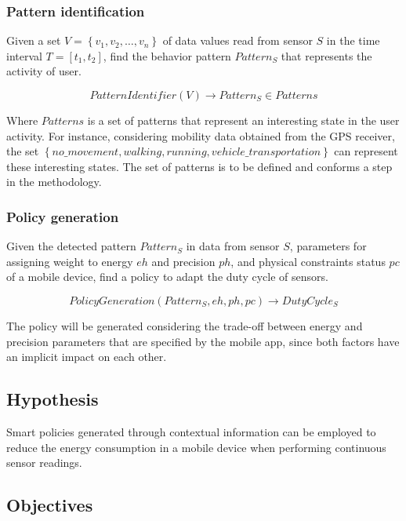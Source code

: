\subsubsection{Pattern identification}
\label{ssub:pattern_identification}
Given a set $V = \left\{v_{1}, v_{2}, \dotsc, v_{n}\right\}$ of data values read from sensor $S$ in the time interval $T = [t_{1}, t_{2}]$, find the behavior pattern $Pattern_{S}$ that represents the activity of user.

\begin{equation}
  PatternIdentifier( V ) \longrightarrow{} Pattern_{S} \in Patterns
\end{equation}

Where $Patterns$ is a set of patterns that represent an interesting state in the user activity.
For instance, considering mobility data obtained from the GPS receiver, the set $\left\{no\_movement, walking, running, vehicle\_transportation\right\}$ can represent these interesting states.
The set of patterns is to be defined and conforms a step in the methodology.


\subsubsection{Policy generation}
\label{ssub:policy_generation}

Given the detected pattern $Pattern_{S}$ in data from sensor $S$, parameters for assigning weight to energy $eh$ and precision $ph$, and physical constraints status $pc$ of a mobile device, find a policy to adapt the duty cycle of sensors.

\begin{equation}
  PolicyGeneration( Pattern_{S}, eh, ph, pc ) \longrightarrow{} DutyCycle_{S}
\end{equation}

The policy will be generated considering the trade-off between energy and precision parameters that are specified by the mobile app, since both factors have an implicit impact on each other.


\subsection{Hypothesis} 
\label{sub:hypothesis}
Smart policies generated through contextual information can be employed to reduce the energy consumption in a mobile device when performing continuous sensor readings.

\subsection{Objectives} 
\label{sub:objectives}

